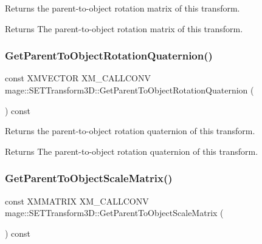 Returns the parent-\/to-\/object rotation matrix of this transform.

\begin{DoxyReturn}{Returns}
The parent-\/to-\/object rotation matrix of this transform. 
\end{DoxyReturn}
\mbox{\label{classmage_1_1_s_e_t_transform3_d_a044bb59a385aac268020d54e315b6fe5}} 
\subsubsection{\texorpdfstring{Get\+Parent\+To\+Object\+Rotation\+Quaternion()}{GetParentToObjectRotationQuaternion()}}
{\footnotesize\ttfamily const X\+M\+V\+E\+C\+T\+OR X\+M\+\_\+\+C\+A\+L\+L\+C\+O\+NV mage\+::\+S\+E\+T\+Transform3\+D\+::\+Get\+Parent\+To\+Object\+Rotation\+Quaternion (\begin{DoxyParamCaption}{ }\end{DoxyParamCaption}) const\hspace{0.3cm}{\ttfamily [noexcept]}}

Returns the parent-\/to-\/object rotation quaternion of this transform.

\begin{DoxyReturn}{Returns}
The parent-\/to-\/object rotation quaternion of this transform. 
\end{DoxyReturn}
\mbox{\label{classmage_1_1_s_e_t_transform3_d_a6def4f05bd7c381759fd2737fcfc5e4a}} 
\subsubsection{\texorpdfstring{Get\+Parent\+To\+Object\+Scale\+Matrix()}{GetParentToObjectScaleMatrix()}}
{\footnotesize\ttfamily const X\+M\+M\+A\+T\+R\+IX X\+M\+\_\+\+C\+A\+L\+L\+C\+O\+NV mage\+::\+S\+E\+T\+Transform3\+D\+::\+Get\+Parent\+To\+Object\+Scale\+Matrix (\begin{DoxyParamCaption}{ }\end{DoxyParamCaption}) const\hspace{0.3cm}{\ttfamily [noexcept]}}

